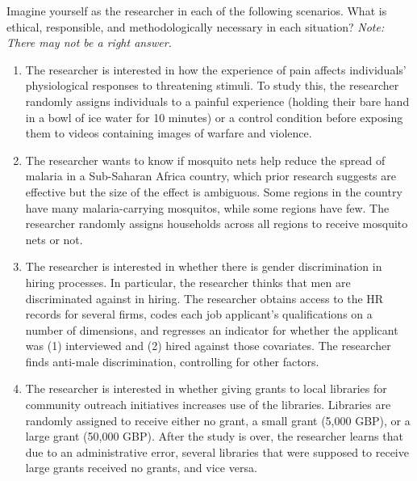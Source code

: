 \documentclass[12pt,a4]{article}
\begin{document}

\vspace{1em} 
\noindent Imagine yourself as the researcher in each of the following scenarios. What is ethical, responsible, and methodologically necessary in each situation? {\em Note: There may not be a right answer.}

\begin{enumerate}\itemsep1em

\item The researcher is interested in how the experience of pain affects individuals' physiological responses to threatening stimuli. To study this, the researcher randomly assigns individuals to a painful experience (holding their bare hand in a bowl of ice water for 10 minutes) or a control condition before exposing them to videos containing images of warfare and violence. %

\item The researcher wants to know if mosquito nets help reduce the spread of malaria in a Sub-Saharan Africa country, which prior research suggests are effective but the size of the effect is ambiguous. Some regions in the country have many malaria-carrying mosquitos, while some regions have few. The researcher randomly assigns households across all regions to receive mosquito nets or not. %

\item The researcher is interested in whether there is gender discrimination in hiring processes. In particular, the researcher thinks that men are discriminated against in hiring. The researcher obtains access to the HR records for several firms, codes each job applicant's qualifications on a number of dimensions, and regresses an indicator for whether the applicant was (1) interviewed and (2) hired against those covariates. The researcher finds anti-male discrimination, controlling for other factors.

\item The researcher is interested in whether giving grants to local libraries for community outreach initiatives increases use of the libraries. Libraries are randomly assigned to receive either no grant, a small grant (5,000 GBP), or a large grant (50,000 GBP). After the study is over, the researcher learns that due to an administrative error, several libraries that were supposed to receive large grants received no grants, and vice versa. %


\end{enumerate}
\end{document}
